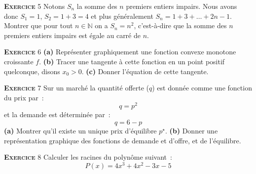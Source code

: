 \documentclass[10pt,a4paper,notitlepage,twocolumn]{article}
\newcommand{\exercise}[1]{\textsc{\textbf{Exercice}} #1}
\newcommand{\question}[1]{\textbf{(#1)}}
\begin{document}
\bigskip

\exercise{5} Notons $S_n$ la somme des $n$ premiers entiers impairs. Nous avons donc $S_1 = 1$, $S_2 = 1 + 3 = 4$ et plus généralement $S_n = 1+3+\dots+2n-1$. Montrer que pour tout $n\in\mathbb N$ on a $S_n = n^2$, c'est-à-dire que la somme des $n$ premiers entiers impairs est égale au carré de $n$.  

\bigskip

\exercise{6} \question{a} Représenter graphiquement une fonction convexe monotone croissante $f$. \question{b} Tracer une tangente à cette fonction en un point positif quelconque, disons $x_{0}>0$. \question{c} Donner l'équation de cette tangente.

\bigskip

\exercise{7} Sur un marché la quantité offerte ($q$) est donnée comme
une fonction du prix par :
\[
q = p^2
\]
et la demande est déterminée par :
\[
q = 6-p
\]
\question{a} Montrer qu'il existe un unique prix d'équilibre
$p^{\star}$. \question{b} Donner une représentation graphique des
fonctions de demande et d'offre, et de l'équilibre.

\bigskip

\exercise{8} Calculer les racines du polynôme suivant : 
\[
P(x) = 4x^3+4x^2-3x-5
\]
\end{document}
